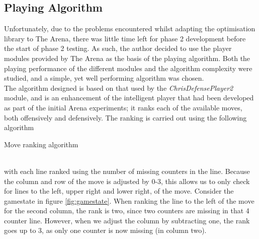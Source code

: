 \subsection{Playing Algorithm}
Unfortunately, due to the problems encountered whilst adapting the optimisation library to The Arena, there was little time left for phase 2 development before the start of phase 2 testing. As such, the author decided to use the player modules provided by The Arena as the basis of the playing algorithm. Both the playing performance of the different modules and the algorithm complexity were studied, and a simple, yet well performing algorithm was chosen.
\\The algorithm designed is based on that used by the \emph{ChrisDefensePlayer2} module\cite{arena}, and is an enhancement of the intelligent player that had been developed as part of the initial Arena experiments; it ranks each of the available moves, both offensively and defensively. The ranking is carried out using the following algorithm
\begin{algorithm}[h]
\label{alg:moverank}
  \SetAlgoLined
  \caption{Move ranking algorithm}
\end{algorithm}
\\with each line ranked using the number of missing counters in the line. Because the column and row of the move is adjusted by 0-3, this allows us to only check for lines to the left, upper right and lower right, of the move. Consider the gamestate in figure \ref{fig:gamestate}. When ranking the line to the left of the move for the second column, the rank is two, since two counters are missing in that 4 counter line. However, when we adjust the column by subtracting one, the rank goes up to 3, as only one counter is now missing (in column two).
